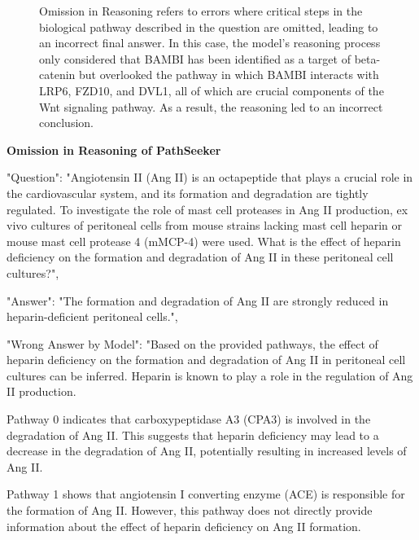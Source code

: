 \begin{figure}[!h]
    \vspace{0.01cm}
    \caption{Omission in Reasoning refers to errors where critical steps in the biological pathway described in the question are omitted, leading to an incorrect final answer. In this case, the model's reasoning process only considered that BAMBI has been identified as a target of beta-catenin but overlooked the pathway in which BAMBI interacts with LRP6, FZD10, and DVL1, all of which are crucial components of the Wnt signaling pathway. As a result, the reasoning led to an incorrect conclusion.}
\end{figure}

\textbf{Omission in Reasoning of PathSeeker}

\begin{tcolorbox}[breakable]
"Question": "Angiotensin II (Ang II) is an octapeptide that plays a crucial role in the cardiovascular system, and its formation and degradation are tightly regulated. To investigate the role of mast cell proteases in Ang II production, ex vivo cultures of peritoneal cells from mouse strains lacking mast cell heparin or mouse mast cell protease 4 (mMCP-4) were used. What is the effect of heparin deficiency on the formation and degradation of Ang II in these peritoneal cell cultures?",

"Answer": "The formation and degradation of Ang II are strongly reduced in heparin-deficient peritoneal cells.",



"Wrong Answer by Model": "Based on the provided pathways, the effect of heparin deficiency on the formation and degradation of Ang II in peritoneal cell cultures can be inferred. Heparin is known to play a role in the regulation of Ang II production.

Pathway 0 indicates that carboxypeptidase A3 (CPA3) is involved in the degradation of Ang II. This suggests that heparin deficiency may lead to a decrease in the degradation of Ang II, potentially resulting in increased levels of Ang II.

Pathway 1 shows that angiotensin I converting enzyme (ACE) is responsible for the formation of Ang II. However, this pathway does not directly provide information about the effect of heparin deficiency on Ang II formation.


\end{tcolorbox}

